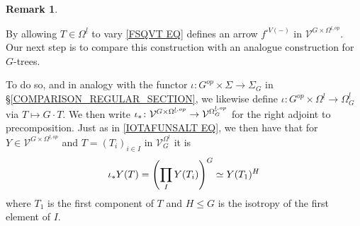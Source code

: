 \documentclass[a4paper,10pt
,draft
]{article}%
\numberwithin{equation}{section}
\numberwithin{figure}{section}
\theoremstyle{definition} %
\newtheorem{remark}[equation]{Remark}%
\newcommand{\1}{\ensuremath{\mathbbm 1}}%
\begin{document}
\begin{remark}
\end{remark}


By allowing $T \in \Omega^{\underline{l}}$
to vary \eqref{FSQVT EQ}
defines an arrow
$f^{\square V(-)}$ in $\mathcal{V}^{G \times \Omega^{\underline{l},op}}$.
Our next step is to compare this construction with an analogue construction for $G$-trees.


To do so, and in analogy with the functor
$\iota \colon G^{op} \times \Sigma \to 
\Sigma_G$
in \S \ref{COMPARISON_REGULAR_SECTION},
we likewise define
$\iota \colon G^{op} \times \Omega^{\underline{l}} \to 
\Omega^{\underline{l}}_G$
via $T \mapsto G \cdot T$.
We then write
$\iota_{\**} 
\colon
\mathcal{V}^{G \times \Omega^{\underline{l},op}}
\to 
\mathcal{V}^{\Omega^{\underline{l},op}_G}
$
for the right adjoint to precomposition.
Just as in \eqref{IOTAFUNSALT EQ}, we then have
that for $Y \in \mathcal{V}^{G \times \Omega^{\underline{l},op}}$
and $T = (T_i)_{i \in I}$
in $\mathcal{V}^{\Omega^{\underline{l}}}_G$ it is
\begin{equation}\label{IOTAFUNSALTBIG EQ}
	\iota_{\**}Y (T)
=
	\left(\prod_{I} Y(T_i)\right)^G
\simeq
	Y(T_1)^H
\end{equation}
where $T_1$ is the first component of $T$
and $H \leq G$ is the isotropy of the first element of $I$.
\end{document}
